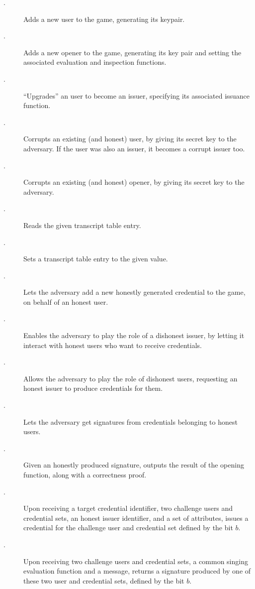 \begin{description}
\item[\UGEN.] Adds a new user to the game, generating its keypair.  
\item[\OGEN.] Adds a new opener to the game, generating its key pair and
  setting the associated evaluation and inspection functions.
\item[\ISET.] ``Upgrades'' an user to become an issuer, specifying its
  associated issuance function.
\item[\UCORR.] Corrupts an existing (and honest) user, by giving its secret
  key to the adversary. If the user was also an issuer, it becomes a corrupt
  issuer too.
\item[\OCORR.] Corrupts an existing (and honest) opener, by giving its secret
  key to the adversary.
\item[\RREG.] Reads the given transcript table entry.
\item[\WREG.] Sets a transcript table entry to the given value.
\item[\OBTISS.] Lets the adversary add a new honestly generated credential to
  the game, on behalf of an honest user.
\item[\OBTAIN.] Enables the adversary to play the role of a dishonest issuer, by
  letting it interact with honest users who want to receive credentials.
\item[\ISSUE.] Allows the adversary to play the role of dishonest users,
  requesting an honest issuer to produce credentials for them.
\item[\SIGN.] Lets the adversary get signatures from credentials belonging
  to honest users.
\item[\OPEN.] Given an honestly produced signature, outputs the result of the
  opening function, along with a correctness proof.
\item[\OBTCHALb.] Upon receiving a target credential identifier, two challenge
  users and credential sets, an honest issuer identifier, and a set of
  attributes, issues a credential for the challenge user and credential set
  defined by the bit $b$. 
\item[\CHALb.] Upon receiving two challenge users and credential sets, a common
  singing evaluation function and a message, returns a signature produced by one
  of these two user and credential sets, defined by the bit $b$.
\end{description}

